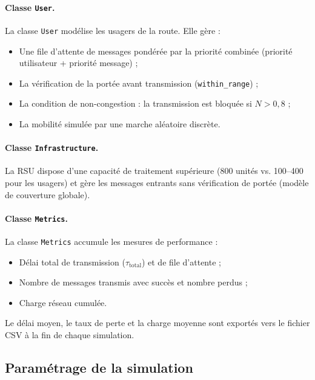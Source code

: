 \documentclass[12pt,a4paper]{article}
\begin{document}
\paragraph{Classe \texttt{User}.}
La classe \texttt{User} modélise les usagers de la route. Elle gère :
\begin{itemize}[leftmargin=*]
  \item Une file d'attente de messages pondérée par la priorité combinée
        (priorité utilisateur + priorité message) ;
  \item La vérification de la portée avant transmission (\texttt{within\_range}) ;
  \item La condition de non-congestion : la transmission est bloquée si
        $N > 0{,}8$ ;
  \item La mobilité simulée par une marche aléatoire discrète.
\end{itemize}

\paragraph{Classe \texttt{Infrastructure}.}
La RSU dispose d'une capacité de traitement supérieure (800 unités vs. 100--400
pour les usagers) et gère les messages entrants sans vérification de portée
(modèle de couverture globale).

\paragraph{Classe \texttt{Metrics}.}
La classe \texttt{Metrics} accumule les mesures de performance :
\begin{itemize}[leftmargin=*]
  \item Délai total de transmission ($\tau_{\text{total}}$) et de file d'attente ;
  \item Nombre de messages transmis avec succès et nombre perdus ;
  \item Charge réseau cumulée.
\end{itemize}

Le délai moyen, le taux de perte et la charge moyenne sont exportés vers le
fichier CSV à la fin de chaque simulation.

\subsection{Paramétrage de la simulation}
\end{document}

